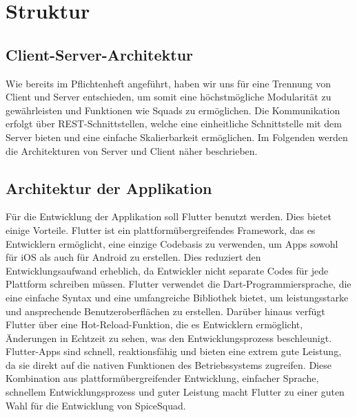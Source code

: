 \documentclass[parskip=full]{scrartcl}
\begin{document}
\section{Struktur}

\subsection{Client-Server-Architektur}
Wie bereits im Pflichtenheft angeführt, haben wir uns für eine Trennung von Client und Server entschieden, um somit eine höchstmögliche Modularität zu gewährleisten und
Funktionen wie Squads zu ermöglichen. Die Kommunikation erfolgt über REST-Schnittstellen, welche eine einheitliche Schnittstelle mit dem Server bieten und eine einfache Skalierbarkeit ermöglichen.
Im Folgenden werden die Architekturen von Server und Client näher beschrieben.

\subsection{Architektur der Applikation}
Für die Entwicklung der Applikation soll Flutter benutzt werden. Dies bietet einige Vorteile. Flutter ist ein plattformübergreifendes Framework, das es Entwicklern ermöglicht, eine einzige Codebasis zu verwenden, um Apps sowohl für iOS als auch für Android zu erstellen. Dies reduziert den Entwicklungsaufwand erheblich, da Entwickler nicht separate Codes für jede Plattform schreiben müssen. Flutter verwendet die Dart-Programmiersprache, die eine einfache Syntax und eine umfangreiche Bibliothek bietet, um leistungsstarke und ansprechende Benutzeroberflächen zu erstellen. Darüber hinaus verfügt Flutter über eine Hot-Reload-Funktion, die es Entwicklern ermöglicht, Änderungen in Echtzeit zu sehen, was den Entwicklungsprozess beschleunigt. Flutter-Apps sind schnell, reaktionsfähig und bieten eine extrem gute Leistung, da sie direkt auf die nativen Funktionen des Betriebssystems zugreifen. Diese Kombination aus plattformübergreifender Entwicklung, einfacher Sprache, schnellem Entwicklungsprozess und guter Leistung macht Flutter zu einer guten Wahl für die Entwicklung von SpiceSquad.
\end{document}
